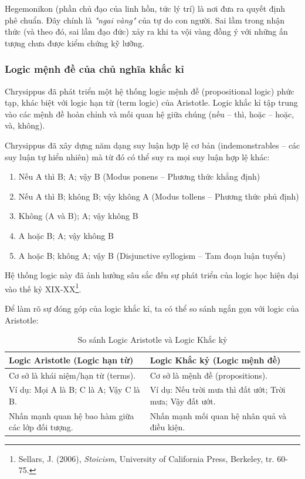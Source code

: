 Hegemonikon (phần chủ đạo của linh hồn, tức lý trí) là nơi đưa ra quyết định phê chuẩn. Đây chính là \textit{"ngai vàng"} của tự do con người. Sai lầm trong nhận thức (và theo đó, sai lầm đạo đức) xảy ra khi ta vội vàng đồng ý với những ấn tượng chưa được kiểm chứng kỹ lưỡng.

\subsubsection{Logic mệnh đề của chủ nghĩa khắc kỉ}

Chrysippus đã phát triển một hệ thống logic mệnh đề (propositional logic) phức tạp, khác biệt với logic hạn từ (term logic) của Aristotle. Logic khắc kỉ tập trung vào các mệnh đề hoàn chỉnh và mối quan hệ giữa chúng (nếu – thì, hoặc – hoặc, và, không).

Chrysippus đã xây dựng năm dạng suy luận hợp lệ cơ bản (indemonstrables – các suy luận tự hiển nhiên) mà từ đó có thể suy ra mọi suy luận hợp lệ khác:
\begin{enumerate}
    \item Nếu A thì B; A; vậy B (Modus ponens – Phương thức khẳng định)
    \item Nếu A thì B; không B; vậy không A (Modus tollens – Phương thức phủ định)
    \item Không (A và B); A; vậy không B
    \item A hoặc B; A; vậy không B
    \item A hoặc B; không A; vậy B (Disjunctive syllogism – Tam đoạn luận tuyển)
\end{enumerate}

Hệ thống logic này đã ảnh hưởng sâu sắc đến sự phát triển của logic học hiện đại vào thế kỷ XIX-XX\footnote{Sellars, J. (2006), \textit{Stoicism}, University of California Press, Berkeley, tr. 60-75.}.

Để làm rõ sự đóng góp của logic khắc kỉ, ta có thể so sánh ngắn gọn với logic của Aristotle:

\begin{table}[H]
    \centering
    \caption{So sánh Logic Aristotle và Logic Khắc kỷ}
    \begin{tabularx}{\linewidth}{|X|X|}
    \hline
    \textbf{Logic Aristotle (Logic hạn từ)} & \textbf{Logic Khắc kỷ (Logic mệnh đề)} \\
    \hline
    Cơ sở là khái niệm/hạn từ (terms). & Cơ sở là mệnh đề (propositions). \\
    \hline
    Ví dụ: Mọi A là B; C là A; Vậy C là B. & Ví dụ: Nếu trời mưa thì đất ướt; Trời mưa; Vậy đất ướt. \\
    \hline
    Nhấn mạnh quan hệ bao hàm giữa các lớp đối tượng. & Nhấn mạnh mối quan hệ nhân quả và điều kiện. \\
    \hline
    \end{tabularx}
\end{table}

